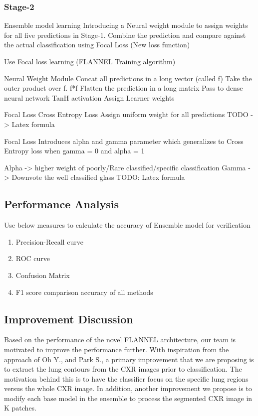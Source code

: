 \documentclass{sigkddExp}
\begin{document}
\subsubsection{Stage-2}

Ensemble model learning
Introducing a Neural weight module to assign weights for all five predictions in Stage-1.
Combine the prediction and compare against the actual classification using Focal Loss (New loss function)

Use Focal loss learning (FLANNEL Training algorithm)

Neural Weight Module
Concat all predictions in a long vector (called f)
Take the outer product over f. f*f
Flatten the prediction in a long matrix
Pass to dense neural network
TanH activation
Assign Learner weights

Focal Loss
Cross Entropy Loss
Assign uniform weight for all predictions
TODO -> Latex formula

Focal Loss
Introduces alpha and gamma parameter which generalizes to Cross Entropy loss when gamma = 0 and alpha = 1

Alpha -> higher weight of poorly/Rare classified/specific classification
Gamma -> Downvote the well classified glass
TODO: Latex formula

\subsection{Performance Analysis}
Use below measures to calculate the accuracy of Ensemble model for verification

\begin{enumerate}
    \item Precision-Recall curve
    \item ROC curve
    \item Confusion Matrix
    \item F1 score comparison accuracy of all methods 
\end{enumerate}



\subsection{Improvement Discussion}

Based on the performance of the novel FLANNEL architecture, our team is
motivated to improve the performance further. With inspiration from the approach
of Oh Y., and Park S., a primary improvement that we are proposing is to extract
the lung contours from the CXR images prior to classification. The motivation
behind this is to have the classifier focus on the specific lung regions versus
the whole CXR image. In addition, another improvement we propose is to modify
each base model in the ensemble to process the segmented CXR image in K patches.
\end{document}
